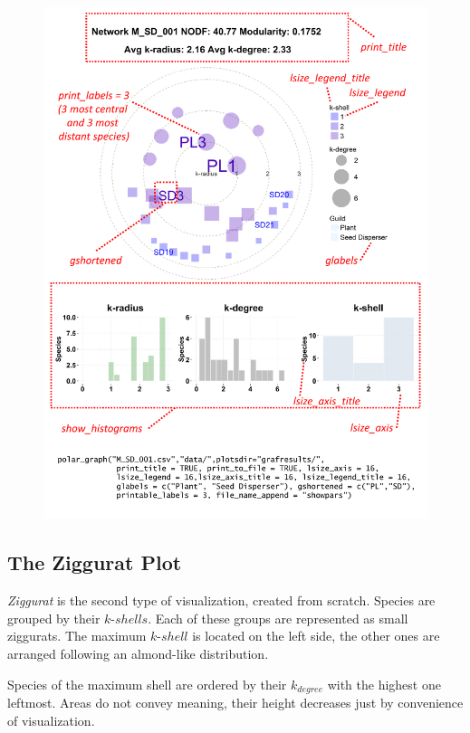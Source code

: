 \documentclass[12pt]{article}
\begin{document}
\clearpage
\begin{figure}[ht!]
\centering
\includegraphics[scale=0.75]{polar_params.pdf}
\label{fig:KMAN_polar_params}
\end{figure}

\clearpage

\subsection*{The Ziggurat Plot}
\label{the_ziggurat_plot}

\textit{Ziggurat} is the second type of visualization, created from scratch. Species are grouped by their $k$-$shells$. Each of these groups are represented as small ziggurats. The maximum $k$-$shell$ is located on the left side, the other ones are arranged following an almond-like distribution. 

Species of the maximum shell are ordered by their $k_{degree}$ with the highest one leftmost. Areas do not convey meaning, their height decreases just by convenience of visualization. 
\end{document}
